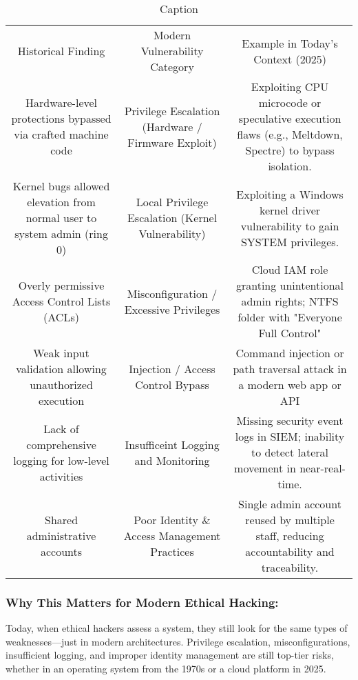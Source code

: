 \begin{table}
    \centering
    \begin{tabular}{ccc}
         Historical Finding&  Modern Vulnerability Category& Example in Today's Context (2025)\\
         Hardware-level protections bypassed via crafted machine code&  Privilege Escalation (Hardware / Firmware Exploit)& Exploiting CPU microcode or speculative execution flaws (e.g., Meltdown, Spectre) to bypass isolation.\\
         Kernel bugs allowed elevation from normal user to system admin (ring 0)&  Local Privilege Escalation (Kernel Vulnerability)& Exploiting a Windows kernel driver vulnerability to gain SYSTEM privileges.\\
         Overly permissive Access Control Lists (ACLs)&  Misconfiguration / Excessive Privileges& Cloud IAM role granting unintentional admin rights; NTFS folder with "Everyone Full Control"\\
         Weak input validation allowing unauthorized execution&  Injection / Access Control Bypass& Command injection or path traversal attack in a modern web app or API\\
         Lack of comprehensive logging for low-level activities&  Insufficeint Logging and Monitoring& Missing security event logs in SIEM; inability to detect lateral movement in near-real-time.\\
         Shared administrative accounts&  Poor Identity \& Access Management Practices	& Single admin account reused by multiple staff, reducing accountability and traceability.\\
    \end{tabular}
    \caption{Caption}
    \label{tab:placeholder}
\end{table}

\subsubsection{Why This Matters for Modern Ethical Hacking:}

Today, when ethical hackers assess a system, they still look for the same types of weaknesses—just in modern architectures. Privilege escalation, misconfigurations, insufficient logging, and improper identity management are still top-tier risks, whether in an operating system from the 1970s or a cloud platform in 2025.











